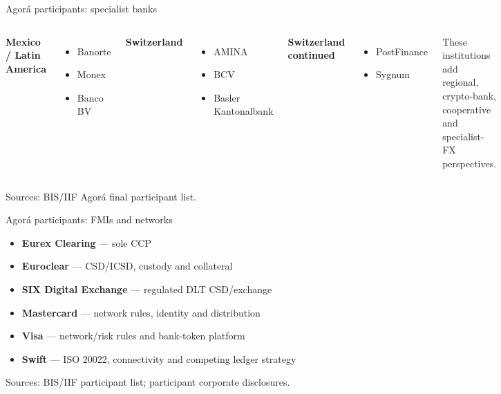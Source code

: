 \documentclass[aspectratio=169,12pt]{beamer}
\newcommand{\rust}[1]{\textcolor{Rust}{\textbf{#1}}}
\newcommand{\blue}[1]{\textcolor{Ocean}{\textbf{#1}}}
\newcommand{\muted}[1]{\textcolor{Quiet}{#1}}
\newcommand{\source}[1]{\vfill\par\fontsize{5.4}{6.5}\selectfont\color{Quiet}Sources: #1}
\newcommand{\tightitems}{\setlength{\itemsep}{0.42em}\setlength{\parskip}{0pt}}
\newcommand{\verytightitems}{\setlength{\itemsep}{0.22em}\setlength{\parskip}{0pt}}
\begin{document}
\begin{frame}{Agor\'a participants: specialist banks}
  \fontsize{10}{12}\selectfont
  \begin{columns}[T,onlytextwidth]
      \rust{Mexico / Latin America}
      \begin{itemize}\verytightitems
        \item Banorte
        \item Monex
        \item Banco BV
      \end{itemize}
      \vspace{0.22cm}
      \rust{Switzerland}
      \begin{itemize}\verytightitems
        \item AMINA
        \item BCV
        \item Basler Kantonalbank
      \end{itemize}
      \blue{Switzerland continued}
      \begin{itemize}\verytightitems
        \item PostFinance
        \item Sygnum
      \end{itemize}
      \vspace{0.22cm}
      \muted{These institutions add regional, crypto-bank, cooperative and specialist-FX perspectives.}
  \end{columns}
  \source{BIS/IIF Agor\'a final participant list.}
\end{frame}

\begin{frame}{Agor\'a participants: FMIs and networks}
  \begin{itemize}\tightitems
    \item \rust{Eurex Clearing} --- sole CCP
    \item \rust{Euroclear} --- CSD/ICSD, custody and collateral
    \item \rust{SIX Digital Exchange} --- regulated DLT CSD/exchange
    \item \rust{Mastercard} --- network rules, identity and distribution
    \item \rust{Visa} --- network/risk rules and bank-token platform
    \item \rust{Swift} --- ISO 20022, connectivity and competing ledger strategy
  \end{itemize}
  \source{BIS/IIF participant list; participant corporate disclosures.}
\end{frame}
\end{document}
